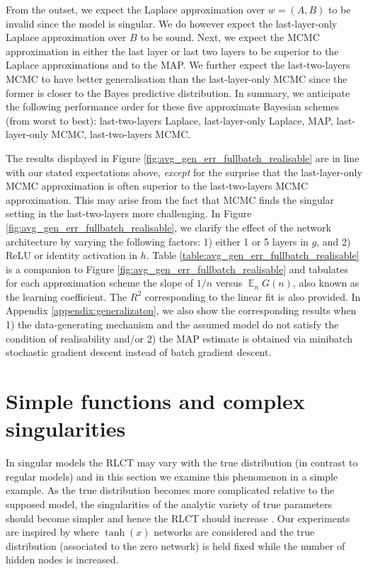 \documentclass[11pt]{article}
\DeclareMathOperator*{\E}{\operatorname{\mathbb{E}}}
\numberwithin{equation}{section}
\theoremstyle{plain}
\theoremstyle{definition}
\begin{document}
From the outset, we expect the Laplace approximation over $w = (A, B)$ to be invalid since the model is singular. We do however expect the last-layer-only Laplace approximation over $B$ to be sound. Next, we expect the MCMC approximation in either the last layer or last two layers to be  superior to the Laplace approximations and to the MAP. We further expect the last-two-layers MCMC to have better generalisation than the last-layer-only MCMC since the former is closer to the Bayes predictive distribution. In summary, we anticipate the following performance order for these five approximate Bayesian schemes (from worst to best): last-two-layers Laplace, last-layer-only Laplace, MAP, last-layer-only MCMC, last-two-layers MCMC.


The results displayed in Figure \ref{fig:avg_gen_err_fullbatch_realisable} are in line with our stated expectations above, \textit{except} for the surprise that the last-layer-only MCMC approximation is often superior to the last-two-layers MCMC approximation. This may arise from the fact that MCMC finds the singular setting in the last-two-layers more challenging. In Figure \ref{fig:avg_gen_err_fullbatch_realisable}, we clarify the effect of the network architecture by varying the following factors:  1) either 1 or 5 layers in $g$, and 2) ReLU or identity activation in $h$. Table \ref{table:avg_gen_err_fullbatch_realisable} is a companion to Figure \ref{fig:avg_gen_err_fullbatch_realisable} and tabulates for each approximation scheme the slope of $1/n$ versus ${\E}_n G(n)$, also known as the learning coefficient. The $R^2$ corresponding to the linear fit is also provided. 
In Appendix \ref{appendix:generalizaton}, we also show the corresponding results when 1) the data-generating mechanism and the assumed model do not satisfy the condition of realisability and/or 2) the MAP estimate is obtained via minibatch stochastic gradient descent instead of batch gradient descent. 



\section{Simple functions and complex singularities}\label{section:simple_func}

In singular models the RLCT may vary with the true distribution (in contrast to regular models) and in this section we examine this phenomenon in a simple example. As the true distribution becomes more complicated relative to the supposed model, the singularities of the analytic variety of true parameters should become simpler and hence the RLCT should increase \citep[\S 7.6]{watanabe_algebraic_2009}. Our experiments are inspired by \citep[\S 7.2]{watanabe_algebraic_2009} where $\operatorname{tanh}(x)$ networks are considered and the true distribution (associated to the zero network) is held fixed while the number of hidden nodes is increased.
\end{document}
